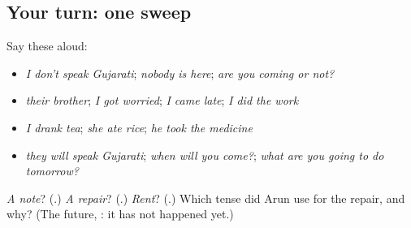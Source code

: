 \subsection*{Your turn: one sweep}
Say these aloud:

\begin{itemize}
\raggedright
  \item \emph{I don't speak Gujarati}; \emph{nobody is here}; \emph{are you coming or not?}
  \item \emph{their brother}; \emph{I got worried}; \emph{I came late}; \emph{I did the work}
  \item \emph{I drank tea}; \emph{she ate rice}; \emph{he took the medicine}
  \item \emph{they will speak Gujarati}; \emph{when will you come?}; \emph{what are you going to do tomorrow?}
\end{itemize}

\begin{tcolorbox}[breakable,colback=teal!4,colframe=teal!35!black,title={Before you move on}]
\emph{A note}? (\textbf{}.) \emph{A repair}? (\textbf{}.) \emph{Rent}? (\textbf{}.) Which tense did Arun use for the repair, and why? (The future, \textbf{}: it has not happened yet.)
\end{tcolorbox}
